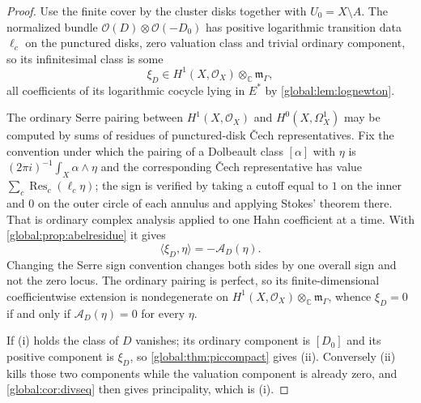 \documentclass[11pt,letterpaper]{article}
\theoremstyle{definition}
\theoremstyle{remark}
\newcommand{\C}{\mathbb C}
\newcommand{\OO}{\mathcal O}
\newcommand{\mK}{\mathfrak m_\Gamma}
\newcommand{\Res}{\operatorname{Res}}
\numberwithin{equation}{section}
\begin{document}
\begin{proof}
Use the finite cover by the cluster disks together with $U_0=X\setminus A$. The normalized bundle $\OO(D)\otimes\OO(-D_0)$ has positive logarithmic transition data $\ell_c$ on the punctured disks, zero valuation class and trivial ordinary component, so its infinitesimal class is some
\begin{equation}\label{global:eq:xiD}
  \xi_D\in H^1(X,\OO_X)\otimes_\C\mK,
\end{equation}
all coefficients of its logarithmic cocycle lying in $E^*$ by \cref{global:lem:lognewton}.

The ordinary Serre pairing between $H^1(X,\OO_X)$ and $H^0(X,\Omega^1_X)$ may be computed by sums of residues of punctured-disk \v Cech representatives. Fix the convention under which the pairing of a Dolbeault class $[\alpha]$ with $\eta$ is $(2\pi i)^{-1}\int_X\alpha\wedge\eta$ and the corresponding \v Cech representative has value $\sum_c\Res_c(\ell_c\eta)$; the sign is verified by taking a cutoff equal to $1$ on the inner and $0$ on the outer circle of each annulus and applying Stokes' theorem there. That is ordinary complex analysis applied to one Hahn coefficient at a time. With \cref{global:prop:abelresidue} it gives
\begin{equation}\label{global:eq:SerreAbel}
  \langle\xi_D,\eta\rangle=-\mathcal A_D(\eta).
\end{equation}
Changing the Serre sign convention changes both sides by one overall sign and not the zero locus. The ordinary pairing is perfect, so its finite-dimensional coefficientwise extension is nondegenerate on $H^1(X,\OO_X)\otimes_\C\mK$, whence $\xi_D=0$ if and only if $\mathcal A_D(\eta)=0$ for every $\eta$.

If (i) holds the class of $D$ vanishes; its ordinary component is $[D_0]$ and its positive component is $\xi_D$, so \cref{global:thm:piccompact} gives (ii). Conversely (ii) kills those two components while the valuation component is already zero, and \cref{global:cor:divseq} then gives principality, which is (i).


\end{proof}
\end{document}
